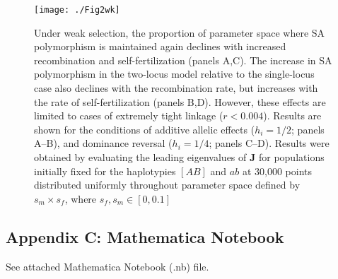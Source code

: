 \documentclass{article}
\begin{document}
\begin{figure}[H]
\texttt{[image: ./Fig2wk]}
\caption{Under weak selection, the proportion of parameter space where SA polymorphism is maintained again declines with increased recombination and self-fertilization (panels A,C). The increase in SA polymorphism in the two-locus model relative to the single-locus case also declines with the recombination rate, but increases with the rate of self-fertilization (panels B,D). However, these effects are limited to cases of extremely tight linkage ($r < 0.004$). Results are shown for the conditions of additive allelic effects ($h_i = 1/2$; panels A--B), and dominance reversal ($h_i = 1/4$; panels C--D). Results were obtained by evaluating the leading eigenvalues of $\mathbf{J}$ for populations initially fixed for the haplotypies $[AB]$ and $ab$ at 30,000 points distributed uniformly throughout parameter space defined by $s_m \times s_f$, where $s_f,s_m \in [0,0.1]$}
\label{fig:wkPolymorhism}
\end{figure}
\newpage{}




\subsection*{Appendix C: Mathematica Notebook}
\renewcommand{\theequation}{C\arabic{equation}}
\setcounter{equation}{0}
\renewcommand{\thefigure}{B\arabic{figure}}
\setcounter{figure}{0}

See attached Mathematica Notebook (.nb) file.


\end{document}
